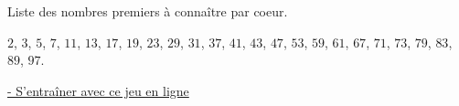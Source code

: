 
\begin{remarque}
	Liste des nombres premiers à connaître par coeur.

	$2$, $3$, $5$, $7$, $11$, $13$, $17$, $19$, $23$, $29$, $31$, $37$, $41$, $43$, $47$, $53$, $59$, $61$, $67$, $71$, $73$, $79$, $83$, $89$, $97$.

	\href{https://isthisprime.com/game/}{ - S'entraîner avec ce jeu en ligne}
\end{remarque}

